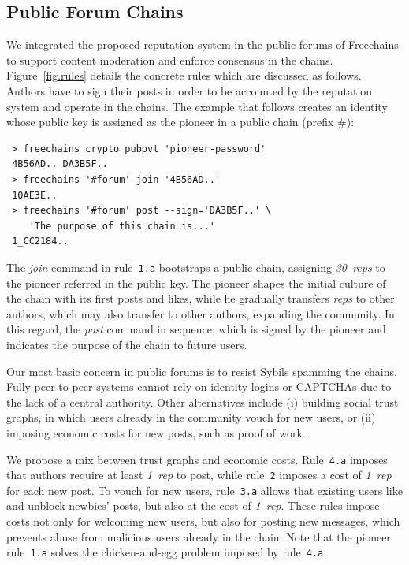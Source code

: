 \documentclass[10pt,journal,compsoc]{IEEEtran}
\newcommand{\FC}       {Freechains\xspace}
\newcommand{\reps}     {\emph{reps}\xspace}
\newcommand{\onerep}   {\emph{1~rep}\xspace}
\newcommand{\nreps}[1] {\emph{#1~reps\xspace}}
\begin{document}
\subsection{Public Forum Chains}
\label{sec.consensus.chains}

We integrated the proposed reputation system in the public forums of \FC to
support content moderation and enforce consensus in the chains.
Figure~\ref{fig.rules} details the concrete rules which are discussed as
follows.
Authors have to sign their posts in order to be accounted by the reputation
system and operate in the chains.
The example that follows creates an identity whose public key is assigned as
the pioneer in a public chain (prefix $\#$):

{\footnotesize
\begin{verbatim}
 > freechains crypto pubpvt 'pioneer-password'
 4B56AD.. DA3B5F..
 > freechains '#forum' join '4B56AD..'
 10AE3E..
 > freechains '#forum' post --sign='DA3B5F..' \
    'The purpose of this chain is...'
 1_CC2184..
\end{verbatim}
}

The \emph{join} command in rule~\texttt{1.a} bootstraps a public chain,
assigning \nreps{30} to the pioneer referred in the public key.
The pioneer shapes the initial culture of the chain with its first posts and
likes, while he gradually transfers \reps to other authors, which may also
transfer to other authors, expanding the community.
%
In this regard, the \emph{post} command in sequence, which is signed by the
pioneer and indicates the purpose of the chain to future users.

Our most basic concern in public forums is to resist Sybils spamming the
chains.
Fully peer-to-peer systems cannot rely on identity logins or CAPTCHAs due
to the lack of a central authority.
Other alternatives include (i) building social trust graphs, in which users
already in the community vouch for new users, or (ii) imposing economic costs
for new posts, such as proof of work.

We propose a mix between trust graphs and economic costs.
Rule~\texttt{4.a} imposes that authors require at least \onerep to post, while
rule~\texttt{2} imposes a cost of \onerep for each new post.
To vouch for new users, rule~\texttt{3.a} allows that existing users like and
unblock newbies' posts, but also at the cost of \onerep.
These rules impose costs not only for welcoming new users, but also for posting
new messages, which prevents abuse from malicious users already in the chain.
%
Note that the pioneer rule~\texttt{1.a} solves the chicken-and-egg problem
imposed by rule~\texttt{4.a}.
\end{document}
